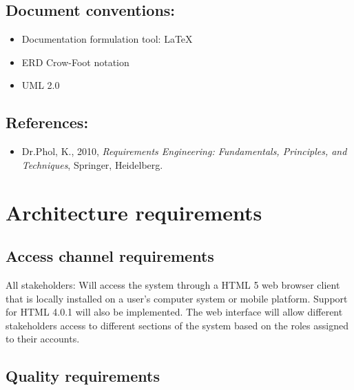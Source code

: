 \documentclass[12pt]{article}
\begin{document}
\vspace{0.5in}

\subsection{Document conventions:}
\vspace{0.1in}
\begin{itemize}
\item Documentation formulation tool: LaTeX
\item ERD Crow-Foot notation
\item UML 2.0
\end{itemize}

\vspace{0.2in}

\subsection{References:}
\vspace{0.1in}
\begin{itemize}
\item Dr.Phol, K., 2010, \textit{Requirements Engineering: Fundamentals, Principles, and Techniques}, Springer, Heidelberg.
\end{itemize}	

\vspace{0.5in}

\newpage
\section{Architecture requirements}
\subsection{Access channel requirements} %
\vspace{0.2in}
All stakeholders: Will access the system through a HTML 5 web browser client that is locally installed on a user's computer system or mobile platform. Support for HTML 4.0.1 will also be implemented. The web interface will allow different stakeholders access to different sections of the system based on the roles assigned to their accounts.

\vspace{0.2in}

\subsection{Quality requirements} %
\vspace{0.2in}
\end{document}
